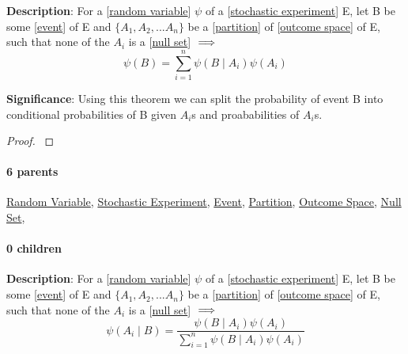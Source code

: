 \documentclass[../main.tex]{subfiles}
\begin{document}
\begin{statement}
\label{statement:Total Probability Theorem}\hspace*{0pt}\par
\end{statement}
\textbf{Description}:
For a [\hyperref[statement:Random Variable]{random variable}] $\psi$ of a [\hyperref[statement:Stochastic Experiment]{stochastic experiment}] E, let B be some [\hyperref[statement:Event]{event}] of E and $\{A_1, A_2, ... A_n\}$ be a [\hyperref[statement:Partition]{partition}] of [\hyperref[statement:Outcome Space]{outcome space}] of E, such that none of the $ A_i $ is a [\hyperref[statement:Null Set]{null set}] $ \implies $
\[
  \psi(B) = \sum_{i=1}^{n} \psi(B \mid A_i ) \psi ( A_i )
\]

\par
{\color{magenta} \textbf{Significance}:
Using this theorem we can split the probability of event B into conditional probabilities of B given $ A_i $s and proababilities of $ A_i $s.
\par}
\begin{proof}{\color{red} \todo}\end{proof}\par
\paragraph{6 parents} \hyperref[statement:Random Variable]{Random Variable}, \hyperref[statement:Stochastic Experiment]{Stochastic Experiment}, \hyperref[statement:Event]{Event}, \hyperref[statement:Partition]{Partition}, \hyperref[statement:Outcome Space]{Outcome Space}, \hyperref[statement:Null Set]{Null Set}, 
\paragraph{0 children} 



\begin{statement}
\label{statement:Bayes Theorem}\hspace*{0pt}\par
\end{statement}
\textbf{Description}:
For a [\hyperref[statement:Random Variable]{random variable}] $\psi$ of a [\hyperref[statement:Stochastic Experiment]{stochastic experiment}] E, let B be some [\hyperref[statement:Event]{event}] of E and $\{A_1, A_2, ... A_n\}$ be a [\hyperref[statement:Partition]{partition}] of [\hyperref[statement:Outcome Space]{outcome space}] of E, such that none of the $ A_i $ is a [\hyperref[statement:Null Set]{null set}] $ \implies $
\[
  \psi(A_i \mid B) = \frac{\psi(B \mid A_i ) \psi( A_i )}{\sum_{i=1}^{n} \psi(B \mid A_i ) \psi ( A_i )}
\]
\end{document}
